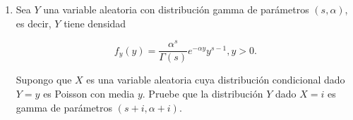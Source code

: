 \documentclass[letterpaper]{article}
\theoremstyle{definition}
\theoremstyle{lemathm}
\theoremstyle{lemathm}
\theoremstyle{lemathm}
\theoremstyle{lemademthm}
\newcommand{\pars}[1]{\left( #1 \right) }
\newcommand{\EE}{\mathbb{E}}
\newcommand{\1}{\mathbbm{1}}
\begin{document}
\begin{enumerate}
\begin{proof}
			Observemos lo siguiente

			\begin{align*}
				\EE\pars{Var\pars{X|Y}} &= \EE\pars{\EE\pars{\pars{X-\EE\pars{X|Y}}^2|Y}} &\text{Por definición de varianza condicional}\\
				&= \EE\pars{\pars{X-\EE\pars{X|Y}}^2} &\text{Por esperanza total}\\
				&= \EE\pars{X^2} - 2\EE\pars{X|Y}\EE\pars{X} +  &\text{Por linealidad de la esperanza}\\
			\end{align*}

		\end{proof}

		\item Sea $Y$ una variable aleatoria con distribución gamma de parámetros $\pars{s,\alpha}$, es decir, $Y$ tiene densidad
		
		\[f_y\pars{y} = \frac{\alpha^s}{\Gamma\pars{s}} e^{-\alpha y} y^{s-1}, y > 0.\]

		Supongo que $X$ es una variable aleatoria cuya distribución condicional dado $Y = y$ es Poisson con media $y$. Pruebe que la distribución $Y$ dado $X = i$ es gamma de parámetros $\pars{s+i,\alpha + i}$.
	\end{enumerate}
\end{document}

